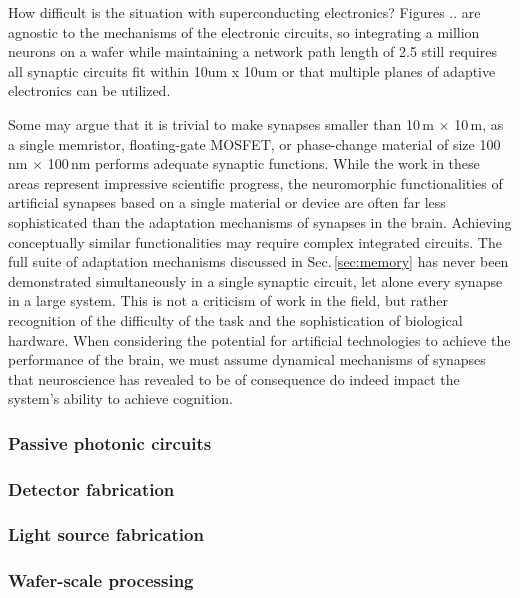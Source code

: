 \documentclass[twocolumn]{article}
\begin{document}
How difficult is the situation with superconducting electronics? Figures .. are agnostic to the mechanisms of the electronic circuits, so integrating a million neurons on a wafer while maintaining a network path length of 2.5 still requires all synaptic circuits fit within 10um x 10um or that multiple planes of adaptive electronics can be utilized. 





Some may argue that it is trivial to make synapses smaller than 10\,\textmu m $\times$ 10\,\textmu m, as a single memristor, floating-gate MOSFET, or phase-change material of size 100\,nm $\times$ 100\,nm performs adequate synaptic functions. While the work in these areas represent impressive scientific progress, the neuromorphic functionalities of artificial synapses based on a single material or device are often far less sophisticated than the adaptation mechanisms of synapses in the brain.  Achieving conceptually similar functionalities may require complex integrated circuits. The full suite of adaptation mechanisms discussed in Sec.\,\ref{sec:memory} has never been demonstrated simultaneously in a single synaptic circuit, let alone every synapse in a large system. This is not a criticism of work in the field, but rather recognition of the difficulty of the task and the sophistication of biological hardware. When considering the potential for artificial technologies to achieve the performance of the brain, we must assume dynamical mechanisms of synapses that neuroscience has revealed to be of consequence do indeed impact the system's ability to achieve cognition.


\subsubsection{Passive photonic circuits}

\subsubsection{Detector fabrication}

\subsubsection{Light source fabrication}


\subsubsection{Wafer-scale processing}
\end{document}
